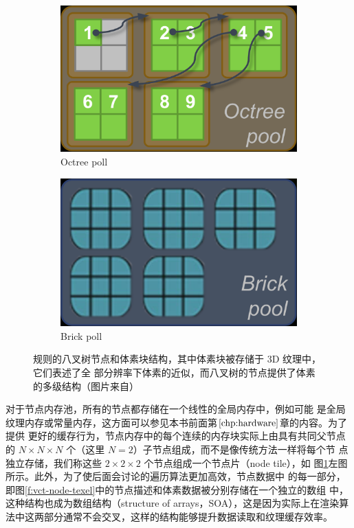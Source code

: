 \begin{figure}
	\begin{subfigure}[b]{0.5\textwidth}
		\includegraphics[width=\textwidth]{figures/vct/vct-13-8}
		\caption{Octree poll}
	\end{subfigure}
	\begin{subfigure}[b]{0.5\textwidth}
		\includegraphics[width=\textwidth]{figures/vct/vct-13-9}
		\caption{Brick poll}
	\end{subfigure}
	\caption{规则的八叉树节点和体素块结构，其中体素块被存储于 3D 纹理中，它们表述了全 部分辨率下体素的近似，而八叉树的节点提供了体素的多级结构（图片来自\cite{a:Gigavoxels:Avoxelbasedrenderingpipelineforefficientexplorationoflargeanddetailedscenes}）}
	\label{f:vct-pools}
\end{figure}

对于节点内存池，所有的节点都存储在一个线性的全局内存中，例如可能 是全局纹理内存或常量内存，这方面可以参见本书前面第$\ref{chp:hardware}$章的内容。为了提供 更好的缓存行为，节点内存中的每个连续的内存块实际上由具有共同父节点的 $N\times N\times N$ 个（这里 $N = 2$）子节点组成，而不是像传统方法一样将每个节 点独立存储，我们称这些 $2\times 2\times 2$ 个节点组成一个节点片（node tile），如 图\ref{f:vct-pools}左图所示。此外，为了使后面会讨论的遍历算法更加高效，节点数据中 的每一部分，即图\ref{f:vct-node-texel}中的节点描述和体素数据被分别存储在一个独立的数组 中，这种结构也成为数组结构（structure of arrays，SOA），这是因为实际上在渲染算法中这两部分通常不会交叉，这样的结构能够提升数据读取和纹理缓存效率。


